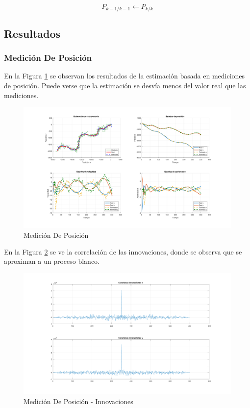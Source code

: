 				\begin{equation*}
					P_{k - 1/k - 1} \leftarrow P_{k/k}
				\end{equation*}


	\subsection{Resultados}
		\subsubsection{Medición De Posición}
			En la Figura \ref{fig:ej2a} se observan los resultados de la estimación basada en mediciones de posición. Puede verse que la estimación se desvía menos del valor real que las mediciones.

		\begin{figure}[H]
			\centering
			\includegraphics[scale=0.5,trim={6,5cm 0 0 0}]{Figuras/graf_ej2a.pdf}
			\caption{Medición De Posición}
			\label{fig:ej2a}
		\end{figure}
		
		En la Figura \ref{fig:ej2a_innov} se ve la correlación de las innovaciones, donde se observa que se aproximan a un proceso blanco.
		
		\begin{figure}[H]
			\centering
			\includegraphics[width=1.0\textwidth,keepaspectratio]{Figuras/covinn_ej2a.pdf}
			\caption{Medición De Posición - Innovaciones}
			\label{fig:ej2a_innov}
		\end{figure}
		
